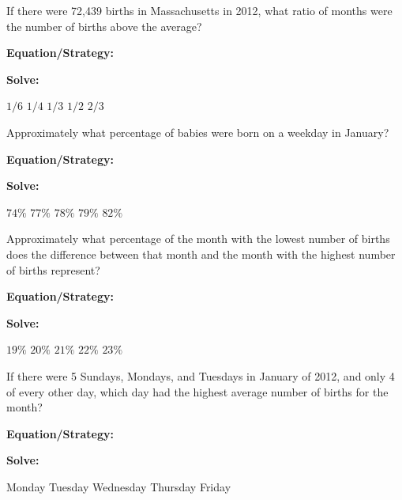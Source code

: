 \begin{multicols*}{2}
\begin{outline}[enumerate]
\medium

\1 If there were 72,439 births in Massachusetts in 2012, what ratio of months were the number of births above the average?

\bigskip
\textbf{Equation/Strategy:} \hrulefill

\bigskip
\textbf{Solve:}

\vfill
\2 $1/6$
\2 $1/4$
\2 $1/3$
\2 $1/2$
\2 $2/3$

\midline

\1 Approximately what percentage of babies were born on a weekday in January?

\bigskip
\textbf{Equation/Strategy:} \hrulefill

\bigskip
\textbf{Solve:}

\vfill
\2 $74\%$
\2 $77\%$
\2 $78\%$
\2 $79\%$
\2 $82\%$

\columnbreak
\advanced

\1 Approximately what percentage of the month with the lowest number of births does the difference between that month and the month with the highest number of births represent?

\bigskip
\textbf{Equation/Strategy:} \hrulefill

\bigskip
\textbf{Solve:} 

\vfill
\2 $19\%$
\2 $20\%$
\2 $21\%$
\2 $22\%$
\2 $23\%$

\midline

\1 If there were 5 Sundays, Mondays, and Tuesdays in January of 2012, and only 4 of every other day, which day had the highest average number of births for the month?

\bigskip
\textbf{Equation/Strategy:}

\bigskip
\textbf{Solve:}

\vfill
\2 Monday
\2 Tuesday
\2 Wednesday
\2 Thursday
\2 Friday
\end{outline}
\end{multicols*}